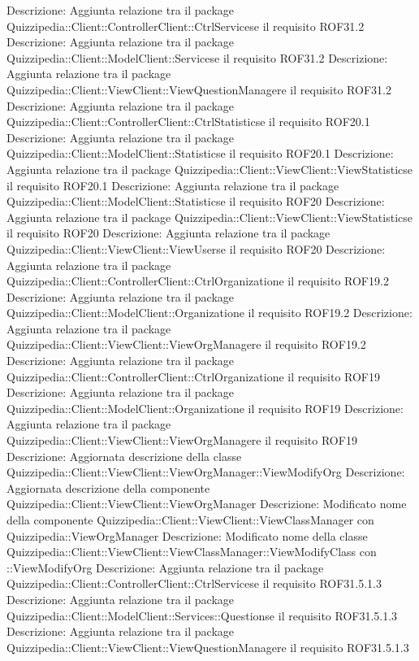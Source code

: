 Descrizione: Aggiunta relazione tra il package Quizzipedia::Client::ControllerClient::CtrlServicese il requisito ROF31.2 
Descrizione: Aggiunta relazione tra il package Quizzipedia::Client::ModelClient::Servicese il requisito ROF31.2 
Descrizione: Aggiunta relazione tra il package Quizzipedia::Client::ViewClient::ViewQuestionManagere il requisito ROF31.2 
Descrizione: Aggiunta relazione tra il package Quizzipedia::Client::ControllerClient::CtrlStatisticse il requisito ROF20.1 
Descrizione: Aggiunta relazione tra il package Quizzipedia::Client::ModelClient::Statisticse il requisito ROF20.1 
Descrizione: Aggiunta relazione tra il package Quizzipedia::Client::ViewClient::ViewStatisticse il requisito ROF20.1 
Descrizione: Aggiunta relazione tra il package Quizzipedia::Client::ModelClient::Statisticse il requisito ROF20 
Descrizione: Aggiunta relazione tra il package Quizzipedia::Client::ViewClient::ViewStatisticse il requisito ROF20 
Descrizione: Aggiunta relazione tra il package Quizzipedia::Client::ViewClient::ViewUserse il requisito ROF20 
Descrizione: Aggiunta relazione tra il package Quizzipedia::Client::ControllerClient::CtrlOrganizatione il requisito ROF19.2 
Descrizione: Aggiunta relazione tra il package Quizzipedia::Client::ModelClient::Organizatione il requisito ROF19.2 
Descrizione: Aggiunta relazione tra il package Quizzipedia::Client::ViewClient::ViewOrgManagere il requisito ROF19.2 
Descrizione: Aggiunta relazione tra il package Quizzipedia::Client::ControllerClient::CtrlOrganizatione il requisito ROF19 
Descrizione: Aggiunta relazione tra il package Quizzipedia::Client::ModelClient::Organizatione il requisito ROF19 
Descrizione: Aggiunta relazione tra il package Quizzipedia::Client::ViewClient::ViewOrgManagere il requisito ROF19 
Descrizione: Aggiornata descrizione della classe Quizzipedia::Client::ViewClient::ViewOrgManager::ViewModifyOrg 
Descrizione: Aggiornata descrizione della componente Quizzipedia::Client::ViewClient::ViewOrgManager 
Descrizione: Modificato nome della componente Quizzipedia::Client::ViewClient::ViewClassManager con Quizzipedia::ViewOrgManager 
Descrizione: Modificato nome della classe Quizzipedia::Client::ViewClient::ViewClassManager::ViewModifyClass con ::ViewModifyOrg 
Descrizione: Aggiunta relazione tra il package Quizzipedia::Client::ControllerClient::CtrlServicese il requisito ROF31.5.1.3 
Descrizione: Aggiunta relazione tra il package Quizzipedia::Client::ModelClient::Services::Questionse il requisito ROF31.5.1.3 
Descrizione: Aggiunta relazione tra il package Quizzipedia::Client::ViewClient::ViewQuestionManagere il requisito ROF31.5.1.3 
